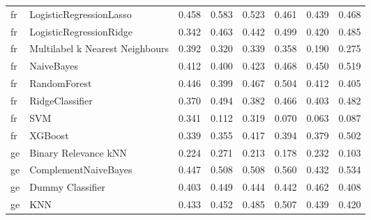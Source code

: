 \begin{tabular}{llllllll}
      fr &         LogisticRegressionLasso & 0.458 &                     0.583 &                 0.523 &                  0.461 &                                   0.439 &     0.468 \\
      fr &         LogisticRegressionRidge & 0.342 &                     0.463 &                 0.442 &                  0.499 &                                   0.420 &     0.485 \\
      fr & Multilabel k Nearest Neighbours & 0.392 &                     0.320 &                 0.339 &                  0.358 &                                   0.190 &     0.275 \\
      fr &                      NaiveBayes & 0.412 &                     0.400 &                 0.423 &                  0.468 &                                   0.450 &     0.519 \\
      fr &                    RandomForest & 0.446 &                     0.399 &                 0.467 &                  0.504 &                                   0.412 &     0.405 \\
      fr &                 RidgeClassifier & 0.370 &                     0.494 &                 0.382 &                  0.466 &                                   0.403 &     0.482 \\
      fr &                             SVM & 0.341 &                     0.112 &                 0.319 &                  0.070 &                                   0.063 &     0.087 \\
      fr &                         XGBoost & 0.339 &                     0.355 &                 0.417 &                  0.394 &                                   0.379 &     0.502 \\
      ge &            Binary Relevance kNN & 0.224 &                     0.271 &                 0.213 &                  0.178 &                                   0.232 &     0.103 \\
      ge &            ComplementNaiveBayes & 0.447 &                     0.508 &                 0.508 &                  0.560 &                                   0.432 &     0.534 \\
      ge &                Dummy Classifier & 0.403 &                     0.449 &                 0.444 &                  0.442 &                                   0.462 &     0.408 \\
      ge &                             KNN & 0.433 &                     0.452 &                 0.485 &                  0.507 &                                   0.439 &     0.420 \\

\end{tabular}
